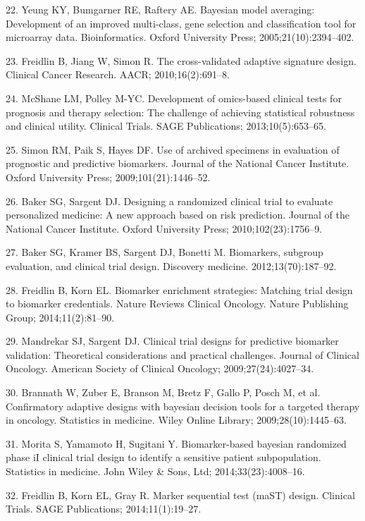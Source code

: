 \documentclass[11pt]{article}
\begin{document}
22. Yeung KY, Bumgarner RE, Raftery AE. Bayesian model averaging:
Development of an improved multi-class, gene selection and
classification tool for microarray data. Bioinformatics. Oxford
University Press; 2005;21(10):2394--402.

23. Freidlin B, Jiang W, Simon R. The cross-validated adaptive signature
design. Clinical Cancer Research. AACR; 2010;16(2):691--8.

24. McShane LM, Polley M-YC. Development of omics-based clinical tests
for prognosis and therapy selection: The challenge of achieving
statistical robustness and clinical utility. Clinical Trials. SAGE
Publications; 2013;10(5):653--65.

25. Simon RM, Paik S, Hayes DF. Use of archived specimens in evaluation
of prognostic and predictive biomarkers. Journal of the National Cancer
Institute. Oxford University Press; 2009;101(21):1446--52.

26. Baker SG, Sargent DJ. Designing a randomized clinical trial to
evaluate personalized medicine: A new approach based on risk prediction.
Journal of the National Cancer Institute. Oxford University Press;
2010;102(23):1756--9.

27. Baker SG, Kramer BS, Sargent DJ, Bonetti M. Biomarkers, subgroup
evaluation, and clinical trial design. Discovery medicine.
2012;13(70):187--92.

28. Freidlin B, Korn EL. Biomarker enrichment strategies: Matching trial
design to biomarker credentials. Nature Reviews Clinical Oncology.
Nature Publishing Group; 2014;11(2):81--90.

29. Mandrekar SJ, Sargent DJ. Clinical trial designs for predictive
biomarker validation: Theoretical considerations and practical
challenges. Journal of Clinical Oncology. American Society of Clinical
Oncology; 2009;27(24):4027--34.

30. Brannath W, Zuber E, Branson M, Bretz F, Gallo P, Posch M, et al.
Confirmatory adaptive designs with bayesian decision tools for a
targeted therapy in oncology. Statistics in medicine. Wiley Online
Library; 2009;28(10):1445--63.

31. Morita S, Yamamoto H, Sugitani Y. Biomarker-based bayesian
randomized phase iI clinical trial design to identify a sensitive
patient subpopulation. Statistics in medicine. John Wiley \& Sons, Ltd;
2014;33(23):4008--16.

32. Freidlin B, Korn EL, Gray R. Marker sequential test (maST) design.
Clinical Trials. SAGE Publications; 2014;11(1):19--27.
\end{document}
